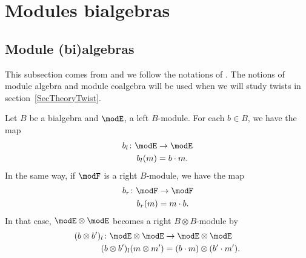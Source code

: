 \section{Modules bialgebras}


\subsection{Module (bi)algebras}
\label{subSecModulebialgebra}

This subsection comes from \cite{GiaquintoZhangTwist} and we follow the notations of \cite{QuantifKhalerian}. The notions of module algebra and module coalgebra will be used when we will study twists in section~\ref{SecTheoryTwist}.

Let $B$ be a bialgebra and $\modE$, a left $B$-module. For each $b\in B$, we have the map
\begin{equation}
	\begin{aligned}
		b_l\colon \modE & \to \modE  \\
		b_l(m)          & =b\cdot m.
	\end{aligned}
\end{equation}
In the same way, if $\modF$ is a right $B$-module, we have the map
\begin{equation}
	\begin{aligned}
		b_r\colon \modF & \to \modF  \\
		b_r(m)          & =m\cdot b.
	\end{aligned}
\end{equation}
In that case, $\modE\otimes\modE$ becomes a right $B\otimes B$-module by
\begin{equation}
	\begin{aligned}
		(b\otimes b')_l\colon \modE\otimes\modE & \to \modE\otimes\modE           \\
		(b\otimes b')_l(m\otimes m')            & =(b\cdot m)\otimes(b'\cdot m').
	\end{aligned}
\end{equation}

